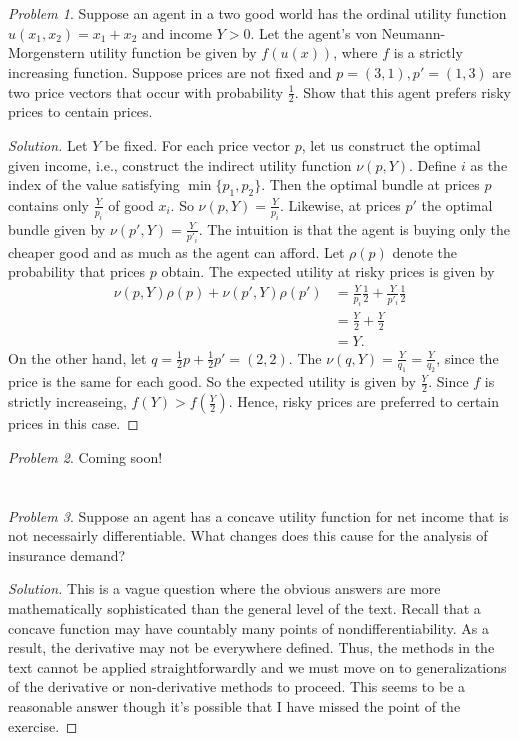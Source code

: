 \documentclass[12pt]{article}
\theoremstyle{definition}
\theoremstyle{remark}
\newtheorem{prob}{Problem}[section]
\begin{document}
\section{}
\begin{prob}
Suppose an agent in a two good world has the ordinal utility function $u(x_1, x_2) = x_1 + x_2$ and income $Y > 0$. Let the agent's von Neumann-Morgenstern utility function be given by $f(u(x))$, where $f$ is a strictly increasing function. Suppose prices are not fixed and $p = (3,1), p' = (1,3)$ are two price vectors that occur with probability $\frac{1}{2}$. Show that this agent prefers risky prices to centain prices.
\end{prob}
\begin{proof}[Solution]
  Let $Y$ be fixed. For each price vector $p$, let us construct the optimal given income, i.e., construct the indirect utility function $\nu(p, Y)$. Define $i$ as the index of the value satisfying $\min \{ p_1, p_2 \}$.
  Then the optimal bundle at prices $p$ contains only $\frac{Y}{p_i}$ of good $x_i$. So $\nu(p, Y) = \frac{Y}{p_i}$. Likewise, at prices $p'$ the optimal bundle given by $\nu(p', Y) = \frac{Y}{p'_i}$. The intuition is that the agent is buying only the cheaper good and as much as the agent can afford. Let $\rho(p)$ denote the probability that prices $p$ obtain. The expected utility at risky prices is given by
  \begin{align}
    \nu(p, Y)\rho(p) + \nu(p', Y)\rho(p') &= \frac{Y}{p_i}\frac{1}{2} + \frac{Y}{p'_i}\frac{1}{2} \\
    &= \frac{Y}{2} + \frac{Y}{2} \\
    &= Y.
  \end{align}
  On the other hand, let $q = \frac{1}{2}p + \frac{1}{2}p' = (2,2)$. The $\nu(q, Y) = \frac{Y}{q_1} = \frac{Y}{q_2}$, since the price is the same for each good. So the expected utility is given by $\frac{Y}{2}$. Since $f$ is strictly increaseing, $f(Y) > f(\frac{Y}{2})$. Hence, risky prices are preferred to certain prices in this case.
\end{proof}
%
%
\begin{prob}
  Coming soon!
\end{prob}
%
%
\section{}
\begin{prob}
  Suppose an agent has a concave utility function for net income that is not necessairly differentiable. What changes does this cause for the analysis of insurance demand?
\end{prob}
\begin{proof}[Solution]
  This is a vague question where the obvious answers are more mathematically sophisticated than the general level of the text. Recall that a concave function may have countably many points of nondifferentiability. As a result, the derivative may not be everywhere defined. Thus, the methods in the text cannot be applied straightforwardly and we must move on to generalizations of the derivative or non-derivative methods to proceed. This seems to be a reasonable answer though it's possible that I have missed the point of the exercise.
\end{proof}
%
%
\end{document}
